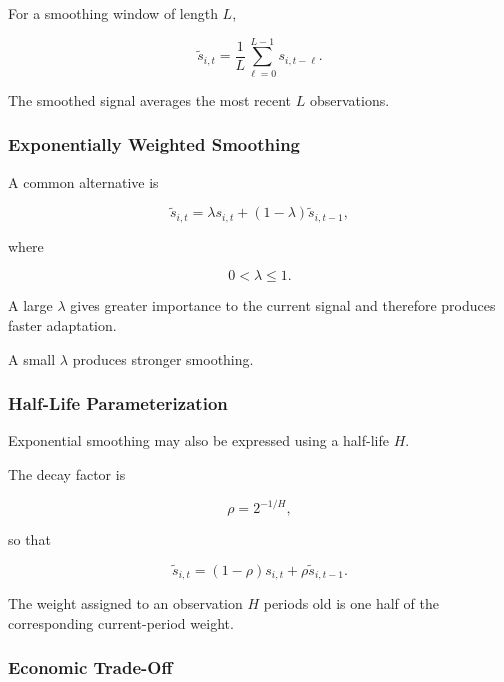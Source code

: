 \documentclass[11pt,a4paper]{article}
\begin{document}
For a smoothing window of length $L$,

\begin{equation}
\boxed{
\widetilde{s}_{i,t}
=
\frac{1}{L}
\sum_{\ell=0}^{L-1}
s_{i,t-\ell}.
}
\end{equation}

The smoothed signal averages the most recent $L$ observations.


\subsubsection{Exponentially Weighted Smoothing}

A common alternative is

\begin{equation}
\boxed{
\widetilde{s}_{i,t}
=
\lambda
s_{i,t}
+
(1-\lambda)
\widetilde{s}_{i,t-1},
}
\end{equation}

where

\begin{equation}
0<\lambda\leq1.
\end{equation}

A large $\lambda$ gives greater importance to the current signal and therefore
produces faster adaptation.

A small $\lambda$ produces stronger smoothing.


\subsubsection{Half-Life Parameterization}

Exponential smoothing may also be expressed using a half-life $H$.

The decay factor is

\begin{equation}
\rho
=
2^{-1/H},
\end{equation}

so that

\begin{equation}
\boxed{
\widetilde{s}_{i,t}
=
(1-\rho)s_{i,t}
+
\rho\widetilde{s}_{i,t-1}.
}
\end{equation}

The weight assigned to an observation $H$ periods old is one half of the
corresponding current-period weight.


\subsubsection{Economic Trade-Off}
\end{document}
